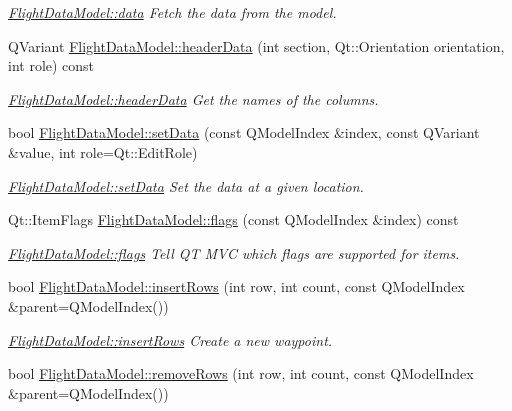 \begin{DoxyCompactItemize}
\begin{DoxyCompactList}\small\item\em \hyperlink{group___path_ga3314e011bb5ed88b34ab33bf8f94d41e}{\-Flight\-Data\-Model\-::data} \-Fetch the data from the model. \end{DoxyCompactList}\item 
\-Q\-Variant \hyperlink{group___path_gaa4c59e9669bd77cd6475133fcf529bad}{\-Flight\-Data\-Model\-::header\-Data} (int section, \-Qt\-::\-Orientation orientation, int role) const 
\begin{DoxyCompactList}\small\item\em \hyperlink{group___path_gaa4c59e9669bd77cd6475133fcf529bad}{\-Flight\-Data\-Model\-::header\-Data} \-Get the names of the columns. \end{DoxyCompactList}\item 
bool \hyperlink{group___path_ga8931eaae5c2004c4d42233bcdad3ee4d}{\-Flight\-Data\-Model\-::set\-Data} (const \-Q\-Model\-Index \&index, const \-Q\-Variant \&value, int role=\-Qt\-::\-Edit\-Role)
\begin{DoxyCompactList}\small\item\em \hyperlink{group___path_ga8931eaae5c2004c4d42233bcdad3ee4d}{\-Flight\-Data\-Model\-::set\-Data} \-Set the data at a given location. \end{DoxyCompactList}\item 
\-Qt\-::\-Item\-Flags \hyperlink{group___path_gaeabf907ec7c9cfc6c410c2dd6678e603}{\-Flight\-Data\-Model\-::flags} (const \-Q\-Model\-Index \&index) const 
\begin{DoxyCompactList}\small\item\em \hyperlink{group___path_gaeabf907ec7c9cfc6c410c2dd6678e603}{\-Flight\-Data\-Model\-::flags} \-Tell \-Q\-T \-M\-V\-C which flags are supported for items. \end{DoxyCompactList}\item 
bool \hyperlink{group___path_ga17a5cd58322554d7fadb0c84031deb26}{\-Flight\-Data\-Model\-::insert\-Rows} (int row, int count, const \-Q\-Model\-Index \&parent=\-Q\-Model\-Index())
\begin{DoxyCompactList}\small\item\em \hyperlink{group___path_ga17a5cd58322554d7fadb0c84031deb26}{\-Flight\-Data\-Model\-::insert\-Rows} \-Create a new waypoint. \end{DoxyCompactList}\item 
bool \hyperlink{group___path_ga951208986321a56cc67eafa5a9d67f0e}{\-Flight\-Data\-Model\-::remove\-Rows} (int row, int count, const \-Q\-Model\-Index \&parent=\-Q\-Model\-Index())

\end{DoxyCompactItemize}
